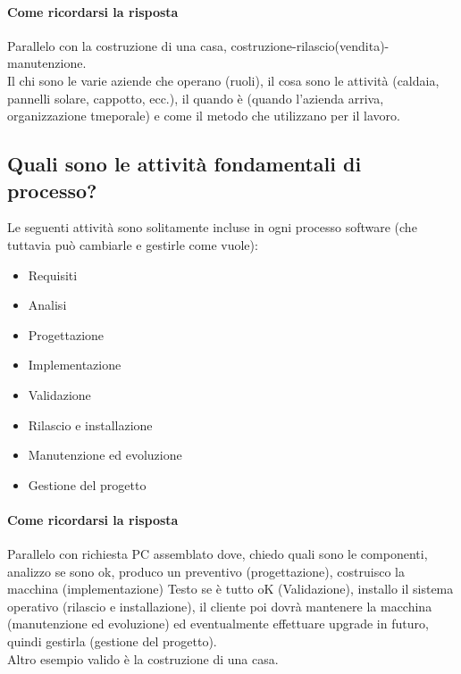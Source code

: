 \documentclass[12pt, a4paper, openany]{book}
\begin{document}
\paragraph*{Come ricordarsi la risposta} Parallelo con la costruzione di una casa, costruzione-rilascio(vendita)-manutenzione.\\
Il chi sono le varie aziende che operano (ruoli), il cosa sono le attività (caldaia, pannelli solare, cappotto, ecc.), il quando
è (quando l'azienda arriva, organizzazione tmeporale) e come il metodo che utilizzano per il lavoro.
\subsection*{Quali sono le attività fondamentali di processo?}
Le seguenti attività sono solitamente incluse in ogni processo software (che tuttavia può cambiarle e gestirle come
vuole):
\begin{itemize}
    \item Requisiti
    \item Analisi
    \item Progettazione
    \item Implementazione
    \item Validazione
    \item Rilascio e installazione
    \item Manutenzione ed evoluzione
    \item Gestione del progetto
\end{itemize}
\paragraph*{Come ricordarsi la risposta}Parallelo con richiesta PC assemblato dove, chiedo quali sono le componenti,
analizzo se sono ok, produco un preventivo (progettazione), costruisco la macchina (implementazione)
Testo se è tutto oK (Validazione), installo il sistema operativo (rilascio e installazione), il cliente poi
dovrà mantenere la macchina (manutenzione ed evoluzione) ed eventualmente effettuare upgrade in futuro, quindi gestirla
(gestione del progetto).\\
Altro esempio valido è la costruzione di una casa.
\end{document}
